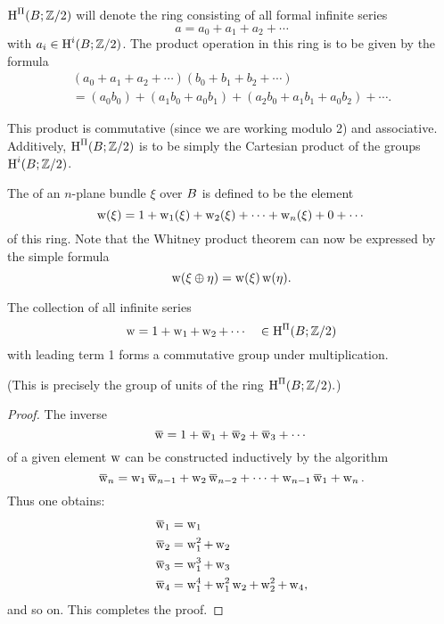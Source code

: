 \documentclass[../main]{subfiles}
\begin{document}
\begin{definition}
$\operatorname{H}^{\Pi}(B;\mathbb{Z}/2)$\index{$\homology^\Pi$} will denote the ring consisting of all formal infinite series
\[
a=a_{0}+a_{1}+a_{2}+\cdots
\]
with $a_i \in \operatorname{H}^{i}(B; \mathbb{Z}/2)$. The product operation in this ring is to be given by the formula
\begin{align*}
(a_{0}+a_{1}+a_{2}+\cdots)(b_{0}+b_{1}+b_{2}+\cdots) \\
=(a_{0} b_{0})+ (a_{1} b_{0}+a_{0} b_{1})+(a_{2} b_{0}+a_{1} b_{1}+a_{0} b_{2})+\cdots.
\end{align*}

This product is commutative (since we are working modulo 2) and associative. Additively, $\operatorname{H}^\Pi(B;\mathbb{Z} / 2)$ is to be simply the Cartesian product of the groups $\operatorname{H}^i(B; \mathbb{Z} / 2)$.
\end{definition}

The  of an $n$-plane bundle $\xi$ over $B$ is defined to be the element
\[
\operatorname{w}(\xi)=1+\operatorname{w}_1(\xi)+\operatorname{w}_2(\xi)+\cdots+\operatorname{w}_n(\xi)+0+\cdots
\]
of this ring. Note that the Whitney product theorem can now be expressed by the simple formula
\[
\operatorname{w}(\xi \oplus \eta)=\operatorname{w}(\xi) \operatorname{w}(\eta) .
\]
\begin{lemma}
\label{lem:04.01}
The collection of all infinite series
\[
\operatorname{w}=1+\operatorname{w}_{1}+\operatorname{w}_{2}+\cdots \quad \in \operatorname{H}^{\Pi}(B; \mathbb{Z} / 2)
\]
with leading term 1 forms a commutative group under multiplication.
\end{lemma}

(This is precisely the group of units of the ring $\operatorname{H}^{\Pi}(B; \mathbb{Z} / 2) .$)

\begin{proof}
The inverse
\[
\xoverline{\sw}=1+\xoverline{\sw}_{1}+\xoverline{\sw}_{2}+\xoverline{\sw}_{3}+\cdots
\]
of a given element $\operatorname{w}$ can be constructed inductively by the algorithm
\[
\xoverline{\sw}_{n}=\sw_{1} \xoverline{\sw}_{n-1}+\sw_{2} \xoverline{\sw}_{n-2}+\cdots+\sw_{n-1} \xoverline{\sw}_{1}+\sw_{n} .
\]
Thus one obtains:
\begin{align*}
\xoverline{\sw}_{1}&=\sw_{1} \\
\xoverline{\sw}_{2}&=\sw_{1}^{2}+\sw_{2} \\
\xoverline{\sw}_{3}&=\sw_{1}^{3}+\sw_{3} \\
\xoverline{\sw}_{4}&=\sw_{1}^{4}+\sw_{1}^{2}\sw_{2}+\sw_{2}^{2}+\sw_{4},
\end{align*}
and so on. This completes the proof.
\end{proof}
\end{document}

